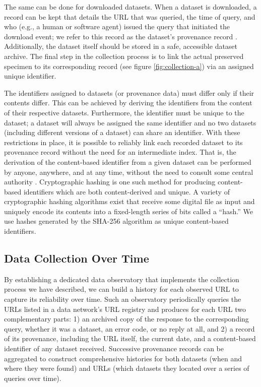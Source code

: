 % 

The same can be done for downloaded datasets. When a dataset is downloaded, a record can be kept that details the URL that was queried, the time of query, and who (e.g., a human or software agent) issued the query that initiated the download event; we refer to this record as the dataset's provenance record \citep{Pasquier_2017}. Additionally, the dataset itself should be stored in a safe, accessible dataset archive. The final step in the collection process is to link the actual preserved specimen to its corresponding record (see figure \ref{fig:collection-a}) via an assigned unique identifier.

The identifiers assigned to datasets (or provenance data) must differ only if their contents differ. This can be achieved by deriving the identifiers from the content of their respective datasets. Furthermore, the identifier must be unique to the dataset; a dataset will always be assigned the same identifier and no two datasets (including different versions of a dataset) can share an identifier. With these restrictions in place, it is possible to reliably link each recorded dataset to its provenance record without the need for an intermediate index. That is, the derivation of the content-based identifier from a given dataset can be performed by anyone, anywhere, and at any time, without the need to consult some central authority \citep{Paskin_1999}. Cryptographic hashing is one such method for producing content-based identifiers which are both content-derived and unique. A variety of cryptographic hashing algorithms exist that receive some digital file as input and uniquely encode its contents into a fixed-length series of bits called a ``hash.'' We use hashes generated by the SHA-256 algorithm  as unique content-based identifiers.

\subsection*{Data Collection Over Time}
By establishing a dedicated data observatory that implements the collection process we have described, we can build a history for each observed URL to capture its reliability over time. Such an observatory periodically queries the URLs listed in a data network's URL registry and produces for each URL two complementary parts: 1) an archived copy of the response to the corresponding query, whether it was a dataset, an error code, or no reply at all, and 2) a record of its provenance, including the URL itself, the current date, and a content-based identifier of any dataset received. Successive provenance records can be aggregated to construct comprehensive histories for both datasets (when and where they were found) and URLs (which datasets they located over a series of queries over time).


